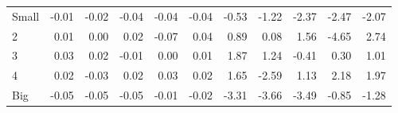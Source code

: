 \begin{table}[!ht]
\begin{tabular}{lrrrrrrrrrr}
    \\
      \cmidrule(r){2-6} \cmidrule(r){7-11}

    Small   & -0.01  & -0.02  & -0.04  & -0.04  & -0.04  & -0.53  & -1.22  & -2.37  & -2.47  & -2.07  \\
         2  & 0.01  & 0.00  & 0.02  & -0.07  & 0.04  & 0.89  & 0.08  & 1.56  & -4.65  & 2.74  \\
         3  & 0.03  & 0.02  & -0.01  & 0.00  & 0.01  & 1.87  & 1.24  & -0.41  & 0.30  & 1.01  \\
         4  & 0.02  & -0.03  & 0.02  & 0.03  & 0.02  & 1.65  & -2.59  & 1.13  & 2.18  & 1.97  \\
    Big     & -0.05  & -0.05  & -0.05  & -0.01  & -0.02  & -3.31  & -3.66  & -3.49  & -0.85  & -1.28  \\

  

  \bottomrule
\end{tabular}
\label{tbl:25_Size_BM_C1997}
\end{table}